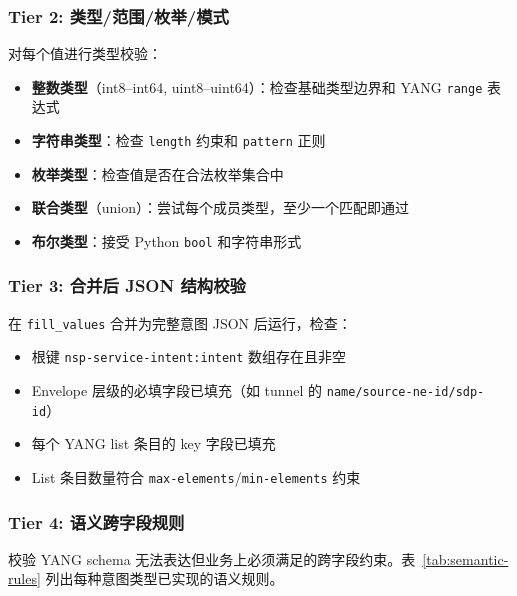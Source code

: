 \documentclass[12pt, a4paper]{article}
\newcommand{\yang}{\textsc{YANG}}
\newcommand{\fillvalues}{\texttt{fill\_values}}
\begin{document}
\subsubsection{Tier 2: 类型/范围/枚举/模式}

对每个值进行类型校验：

\begin{itemize}
  \item \textbf{整数类型}（int8--int64, uint8--uint64）：检查基础类型边界和 \yang{} \texttt{range} 表达式
  \item \textbf{字符串类型}：检查 \texttt{length} 约束和 \texttt{pattern} 正则
  \item \textbf{枚举类型}：检查值是否在合法枚举集合中
  \item \textbf{联合类型}（union）：尝试每个成员类型，至少一个匹配即通过
  \item \textbf{布尔类型}：接受 Python \texttt{bool} 和字符串形式
\end{itemize}

\subsubsection{Tier 3: 合并后 JSON 结构校验}

在 \fillvalues{} 合并为完整意图 JSON 后运行，检查：

\begin{itemize}
  \item 根键 \texttt{nsp-service-intent:intent} 数组存在且非空
  \item Envelope 层级的必填字段已填充（如 tunnel 的 \texttt{name/source-ne-id/sdp-id}）
  \item 每个 \yang{} list 条目的 key 字段已填充
  \item List 条目数量符合 \texttt{max-elements}/\texttt{min-elements} 约束
\end{itemize}

\subsubsection{Tier 4: 语义跨字段规则}

校验 \yang{} schema 无法表达但业务上必须满足的跨字段约束。表~\ref{tab:semantic-rules} 列出每种意图类型已实现的语义规则。
\end{document}
